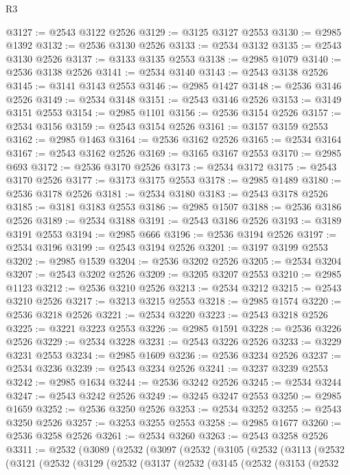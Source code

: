 \begin{lexlean}{R3}
\begin{coremodule}
@3127 := @2543 @3122 @2526
@3129 := @3125 @3127 @2553
@3130 := @2985 @1392
@3132 := @2536 @3130 @2526
@3133 := @2534 @3132
@3135 := @2543 @3130 @2526
@3137 := @3133 @3135 @2553
@3138 := @2985 @1079
@3140 := @2536 @3138 @2526
@3141 := @2534 @3140
@3143 := @2543 @3138 @2526
@3145 := @3141 @3143 @2553
@3146 := @2985 @1427
@3148 := @2536 @3146 @2526
@3149 := @2534 @3148
@3151 := @2543 @3146 @2526
@3153 := @3149 @3151 @2553
@3154 := @2985 @1101
@3156 := @2536 @3154 @2526
@3157 := @2534 @3156
@3159 := @2543 @3154 @2526
@3161 := @3157 @3159 @2553
@3162 := @2985 @1463
@3164 := @2536 @3162 @2526
@3165 := @2534 @3164
@3167 := @2543 @3162 @2526
@3169 := @3165 @3167 @2553
@3170 := @2985 @693
@3172 := @2536 @3170 @2526
@3173 := @2534 @3172
@3175 := @2543 @3170 @2526
@3177 := @3173 @3175 @2553
@3178 := @2985 @1489
@3180 := @2536 @3178 @2526
@3181 := @2534 @3180
@3183 := @2543 @3178 @2526
@3185 := @3181 @3183 @2553
@3186 := @2985 @1507
@3188 := @2536 @3186 @2526
@3189 := @2534 @3188
@3191 := @2543 @3186 @2526
@3193 := @3189 @3191 @2553
@3194 := @2985 @666
@3196 := @2536 @3194 @2526
@3197 := @2534 @3196
@3199 := @2543 @3194 @2526
@3201 := @3197 @3199 @2553
@3202 := @2985 @1539
@3204 := @2536 @3202 @2526
@3205 := @2534 @3204
@3207 := @2543 @3202 @2526
@3209 := @3205 @3207 @2553
@3210 := @2985 @1123
@3212 := @2536 @3210 @2526
@3213 := @2534 @3212
@3215 := @2543 @3210 @2526
@3217 := @3213 @3215 @2553
@3218 := @2985 @1574
@3220 := @2536 @3218 @2526
@3221 := @2534 @3220
@3223 := @2543 @3218 @2526
@3225 := @3221 @3223 @2553
@3226 := @2985 @1591
@3228 := @2536 @3226 @2526
@3229 := @2534 @3228
@3231 := @2543 @3226 @2526
@3233 := @3229 @3231 @2553
@3234 := @2985 @1609
@3236 := @2536 @3234 @2526
@3237 := @2534 @3236
@3239 := @2543 @3234 @2526
@3241 := @3237 @3239 @2553
@3242 := @2985 @1634
@3244 := @2536 @3242 @2526
@3245 := @2534 @3244
@3247 := @2543 @3242 @2526
@3249 := @3245 @3247 @2553
@3250 := @2985 @1659
@3252 := @2536 @3250 @2526
@3253 := @2534 @3252
@3255 := @2543 @3250 @2526
@3257 := @3253 @3255 @2553
@3258 := @2985 @1677
@3260 := @2536 @3258 @2526
@3261 := @2534 @3260
@3263 := @2543 @3258 @2526
@3311 := @2532
    (@3089
      (@2532
        (@3097
          (@2532
            (@3105
              (@2532
                (@3113
                  (@2532
                    (@3121
                      (@2532
                        (@3129
                          (@2532
                            (@3137
                              (@2532
                                (@3145
                                  (@2532
                                    (@3153
                                      (@2532

\end{coremodule}
\end{lexlean}
